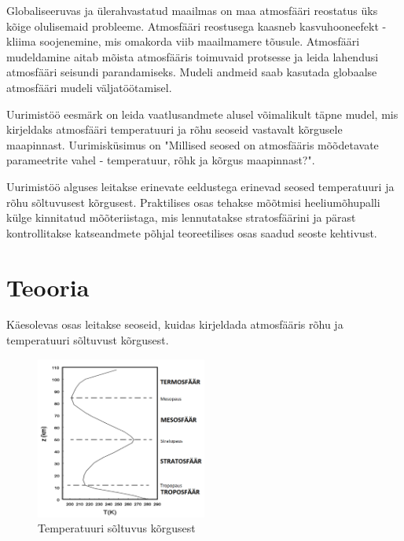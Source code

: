\documentclass{trkut}%
\begin{document}
\maketitle%
\tableofcontents%

\nummerdame%
Globaliseeruvas ja ülerahvastatud maailmas on maa atmosfääri reostatus üks kõige olulisemaid probleeme. Atmosfääri reostusega kaasneb kasvuhooneefekt - kliima soojenemine, mis omakorda viib maailmamere tõusule. Atmosfääri mudeldamine aitab mõista atmosfääris toimuvaid protsesse ja leida lahendusi atmosfääri seisundi parandamiseks. Mudeli andmeid saab kasutada globaalse atmosfääri mudeli väljatöötamisel.

Uurimistöö eesmärk on leida vaatlusandmete alusel võimalikult täpne mudel, mis kirjeldaks atmosfääri temperatuuri ja rõhu seoseid vastavalt kõrgusele maapinnast. Uurimisküsimus on "Millised seosed on atmosfääris mõõdetavate parameetrite vahel - temperatuur, rõhk ja kõrgus maapinnast?".

Uurimistöö alguses leitakse erinevate eeldustega erinevad seosed temperatuuri ja rõhu sõltuvusest kõrgusest. Praktilises osas tehakse mõõtmisi heeliumõhupalli külge kinnitatud mõõteriistaga, mis lennutatakse stratosfäärini ja pärast kontrollitakse katseandmete põhjal teoreetilises osas saadud seoste kehtivust.





\chapter{Teooria}
Käesolevas osas leitakse seoseid, kuidas kirjeldada atmosfääris rõhu ja temperatuuri sõltuvust kõrgusest.

\begin{figure}[h]
	\includegraphics[width=0.5\textwidth]{PicGra/Profile2.png}
	\caption{Temperatuuri sõltuvus kõrgusest}
	\label{profile}%
\end{figure}
\end{document}
